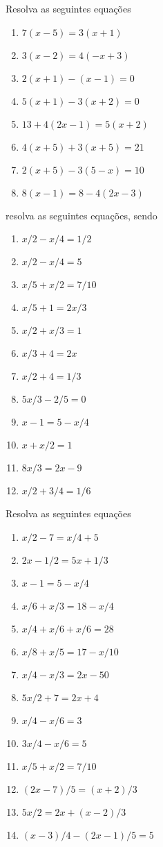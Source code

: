 \item Resolva as seguintes equações
\begin{multicols}{2}				
\begin{enumerate}					
	\item $7(x - 5) = 3 (x + 1)$
	\item $3 ( x - 2 ) = 4 (-x + 3)$
	\item $2 (x +1) - (x -1) = 0$
	\item $5(x + 1) -3 (x +2) = 0$
	\item $13 + 4(2x -1) = 5 (x +2)$
	\item $4(x + 5) + 3 (x +5)= 21$
	\item $2 (x +5 ) - 3 (5 - x) =10$
	\item $8 ( x -1) = 8 -4(2x - 3)$
\end{enumerate}	
\end{multicols}


\item resolva as seguintes equações, sendo
\begin{multicols}{2}				
\begin{enumerate}					
	\item $ x /2 - x/4 = 1 /2$
	\item $x/2 - x/4 = 5$
	\item $x/5 + x/2 = 7/10$
	\item $x/5 + 1 = 2x/3$
	\item $x/2 + x/3 = 1$
	\item $x/3 + 4 = 2x$
	\item $x/2 + 4 = 1/3$
	\item $5x/3 - 2/5 = 0$
	\item $x - 1 = 5 - x/4$
	\item $x + x/2 = 1$
	\item $8x/3 = 2x - 9$
	\item $x/2 + 3/4 = 1/6$
\end{enumerate}	
\end{multicols}

\item Resolva as seguintes equações
\begin{multicols}{2}				
\begin{enumerate}					
	\item $x/2 - 7 = x/4 + 5$
	\item $2x - 1/2 = 5x + 1/3$
	\item $x - 1 = 5 - x/4$
	\item $x/6 + x/3 = 18 - x/4$
	\item $x/4 + x/6 + x/6 = 28$
	\item $x/8 + x/5 = 17 - x/10$
	\item $x/4 - x/3 = 2x - 50$
	\item $5x /2 + 7 = 2x + 4$
	\item $x/4 - x/6 = 3$
	\item $3x/4 - x/6 = 5$
	\item $x/5 + x/2 = 7/10$
	\item $(2x - 7)/5 = (x + 2)/3$
	\item $5x/2 = 2x + (x - 2) / 3$
	\item $(x - 3)/4 - (2x - 1) / 5 = 5$
\end{enumerate}	
\end{multicols}

